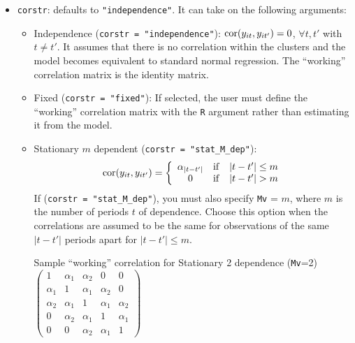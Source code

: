 \begin{itemize}
\item \texttt{corstr}: defaults to {\tt "independence"}.  It can take on the following arguments:
\begin{itemize}
\item Independence (\texttt{corstr = "independence"}): ${\rm
    cor}(y_{it}, y_{it'})=0$, $\forall t, t'$ with $t\ne t'$.  It assumes that there is no correlation within the clusters and the model becomes equivalent to standard normal regression.  The ``working'' correlation matrix is the identity matrix.
\item Fixed (\texttt{corstr = "fixed"}): If selected, the user must define the ``working'' correlation matrix with the \texttt{R} argument rather than estimating it from the model.
\item Stationary $m$ dependent (\texttt{corstr = "stat\_M\_dep"}):
  $${\rm cor}(y_{it}, y_{it'})=\left\{\begin{array}{ccc}
      \alpha_{|t-t'|} & {\rm if} & |t-t'|\le m \\ 0 & {\rm if}
      & |t-t'| > m
    \end{array}\right.$$
  If (\texttt{corstr = "stat\_M\_dep"}), you must also specify \texttt{Mv} = $m$, where $m$
is the number of periods $t$ of dependence.  Choose this option when the correlations are assumed to be the same for observations of the same $|t-t'|$ periods apart for $|t-t'| \leq m$.
\begin{center}
Sample ``working'' correlation for Stationary 2 dependence ({\tt Mv}=2)\\
\bigskip
$\left( \begin{array}{ccccc}
1 & \alpha_1 & \alpha_2 & 0 & 0 \\
\alpha_1 & 1 & \alpha_1 & \alpha_2 & 0 \\
\alpha_2 & \alpha_1 & 1 & \alpha_1 & \alpha_2 \\
0 & \alpha_2 & \alpha_1 & 1 & \alpha_1 \\
0 & 0 & \alpha_2 & \alpha_1 & 1
\end{array} \right) $
\end{center}


\end{itemize}
\end{itemize}
